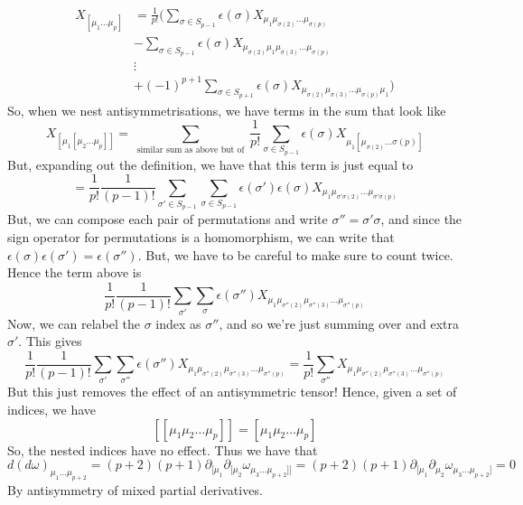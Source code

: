 \documentclass[11pt, a4paper]{article}   	%
\theoremstyle{slplain}
\begin{document}
\begin{align*}
X_{[ \mu_1 \dots \mu_{p } ] } &=    \frac{1}{ p ! } \big (  \sum_{\sigma \in S_{p - 1}} \epsilon ( \sigma ) X_{\mu_1 \mu_{ \sigma ( 2)  } \dots \mu_{ \sigma ( p ) } } \\
&- \sum_{ \sigma \in S_{ p - 1}} \epsilon( \sigma ) X_{ \mu_{ \sigma ( 2 ) } \mu_1  \mu_{ \sigma ( 3)  } \dots \mu_{ \sigma ( p ) }} \\
      & \vdots \\
      & + ( - 1)^{p + 1 } \sum_{ \sigma \in S_{ p + 1  } } \epsilon ( \sigma ) X_{ \mu_{ \sigma ( 2)  } \mu_{ \sigma( 3)  }  \dots \mu_{ \sigma ( p ) } \mu_1 }  \big )  
\end{align*}
So, when we nest antisymmetrisations, we have terms in the sum 
that look like
\[
X_{ [ \mu_1 [ \mu_2 \dots \mu_{p } ]]} =\sum_{ \text{ similar sum as above but of } } \frac{1}{ p ! } \sum_{ \sigma \in S_{ p - 1}  } \epsilon ( \sigma ) X_{ \mu_1 [ \mu_{ \sigma ( 2)  } \dots \sigma ( p )  ] } 
\] But, expanding out the definition, we have that this term 
is just equal to 
\[
= \frac{1}{ p ! } \frac{1}{ ( p - 1 )! } \sum_{ \sigma' \in S_{ p - 1 }  } \sum_{ \sigma \in S_{ p - 1  } } \epsilon( \sigma' ) \epsilon ( \sigma )   X_{ \mu_1  \mu_{ \sigma' \sigma ( 2)  } \dots \mu_{  \sigma' \sigma ( p )   }  } 
\] But, we can compose each pair of permutations and write $ \sigma '' = \sigma' \sigma $, and since 
the sign operator for permutations is a homomorphism, 
we can write that  $ \epsilon ( \sigma ) \epsilon ( \sigma ' ) = \epsilon ( \sigma'' ) $. But, 
we have to be careful to make sure to count twice. Hence the term above is 
\[
\frac{1}{p ! } \frac{1}{ ( p - 1) ! } \sum_{ \sigma'  } \sum_{ \sigma } \epsilon ( \sigma'') X_{ \mu_1 \mu_{ \sigma '' ( 2) } \mu_{ \sigma'' ( 3 ) } \dots \mu_{ \sigma '' ( p ) }}
\] Now, we can relabel the $ \sigma $ index as $ \sigma''$, and so we're just summing 
over and extra $ \sigma' $. This gives
\[
 \frac{1}{p ! } \frac{1}{ ( p - 1 ) ! } \sum_{ \sigma '  } \sum_{ \sigma'' } \epsilon( \sigma '' )  X_{ \mu_1 \mu_{ \sigma '' ( 2) } \mu_{ \sigma'' ( 3 ) } \dots \mu_{ \sigma '' ( p ) }} = \frac{1}{p ! } 
\sum_{ \sigma '' } X_{ \mu_1 \mu_{ \sigma '' ( 2) } \mu_{ \sigma'' ( 3 ) } \dots \mu_{ \sigma '' ( p ) }} 
\] But this just removes the effect of an antisymmetric tensor! Hence, given a set of indices, we have
\[
[ [ \mu_1 \mu_2 \dots \mu_{ p } ] ] = [ \mu_1 \mu_2 \dots \mu_{p } ] 
\] So, the nested indices have no effect. 
Thus we have that 
\[
d ( d \omega  )_{ \mu_1 \dots \mu_{ p + 2 }  } = ( p + 2) ( p + 1 ) \partial_{ [ \mu_1  } \partial_{ [ \mu_2  } \omega _{ \mu_3 \dots \mu_{ p + 2  } ] ] }  = ( p + 2 )( p + 1) \partial _{ [ \mu_1 } \partial_{ \mu_2  } \omega _{ \mu_3 \dots \mu_{ p + 2 }  ] } = 0
\] By antisymmetry of mixed partial derivatives. 
\end{document}
